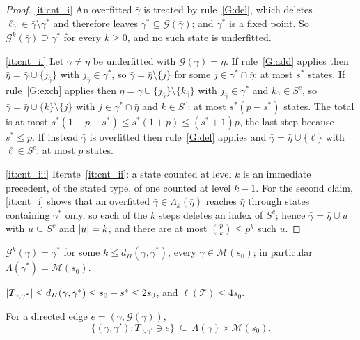 \begin{proof}
    \ref{it:cnt_i} An overfitted $\bar\gamma$ is treated by
    rule~\ref{G:del}, which deletes
    $\ell_{\bar\gamma}\in\bar\gamma\setminus\gamma^{\ast}$ and therefore
    leaves $\gamma^{\ast}\subseteq\mathcal{G}(\bar\gamma)$; and
    $\gamma^{\ast}$ is a fixed point. So
    $\mathcal{G}^{k}(\bar\gamma)\supseteq\gamma^{\ast}$ for every
    $k\geq0$, and no such state is underfitted.

    \ref{it:cnt_ii} Let $\bar\gamma\neq\bar\eta$ be underfitted with
    $\mathcal{G}(\bar\gamma)=\bar\eta$. If rule~\ref{G:add} applies then
    $\bar\eta=\bar\gamma\cup\{j_{\bar\gamma}\}$ with
    $j_{\bar\gamma}\in\gamma^{\ast}$, so
    $\bar\gamma=\bar\eta\setminus\{j\}$ for some
    $j\in\gamma^{\ast}\cap\bar\eta$: at most $s^{\ast}$ states. If
    rule~\ref{G:exch} applies then
    $\bar\eta=\bar\gamma\cup\{j_{\bar\gamma}\}
    \setminus\{k_{\bar\gamma}\}$ with $j_{\bar\gamma}\in\gamma^{\ast}$
    and $k_{\bar\gamma}\in S^{c}$, so
    $\bar\gamma=\bar\eta\cup\{k\}\setminus\{j\}$ with
    $j\in\gamma^{\ast}\cap\bar\eta$ and $k\in S^{c}$: at most
    $s^{\ast}(p-s^{\ast})$ states. The total is at most
    $s^{\ast}(1+p-s^{\ast})\leq s^{\ast}(1+p)\leq(s^{\ast}+1)p$, the last
    step because $s^{\ast}\leq p$. If instead $\bar\gamma$ is overfitted
    then rule~\ref{G:del} applies and $\bar\gamma=\bar\eta\cup\{\ell\}$
    with $\ell\in S^{c}$: at most $p$ states.

    \ref{it:cnt_iii} Iterate~\ref{it:cnt_ii}: a state counted at level
    $k$ is an immediate precedent, of the stated type, of one counted at
    level $k-1$. For the second claim, \ref{it:cnt_i} shows that an
    overfitted $\bar\gamma\in\Lambda_k(\bar\eta)$ reaches $\bar\eta$
    through states containing $\gamma^{\ast}$ only, so each of the $k$
    steps deletes an index of $S^{c}$; hence
    $\bar\gamma=\bar\eta\cup u$ with $u\subseteq S^{c}$ and $\lvert u\rvert=k$,
    and there are at most $\binom{p}{k}\leq p^{k}$ such $u$.
\end{proof}

\begin{lemma}
    \label{lemma:paths}
    \begin{equivcond}
        \item\label{it:pp_i} $\mathcal{G}^{k}(\gamma)=\gamma^{\ast}$ for
        some $k\leq d_H(\gamma,\gamma^{\ast})$, every
        $\gamma\in\mathscr{M}(s_0)$; in particular
        $\Lambda(\gamma^{\ast})=\mathscr{M}(s_0)$.
        \item\label{it:pp_ii} $\lvert T_{\gamma,\gamma^{\ast}}\rvert\leq
        d_H(\gamma,\gamma^{\ast})\leq s_0+s^{\ast}\leq2s_0$, and
        $\ell(\mathcal{T})\leq4s_0$.
        \item\label{it:pp_iii} For a directed edge
        $e=(\bar\gamma,\mathcal{G}(\bar\gamma))$,
        \begin{equation*}
            \bigl\{(\gamma,\gamma'):T_{\gamma,\gamma'}\ni e\bigr\}
            \ \subseteq\ \Lambda(\bar\gamma)\times\mathscr{M}(s_0) .
        \end{equation*}
    \end{equivcond}
\end{lemma}

